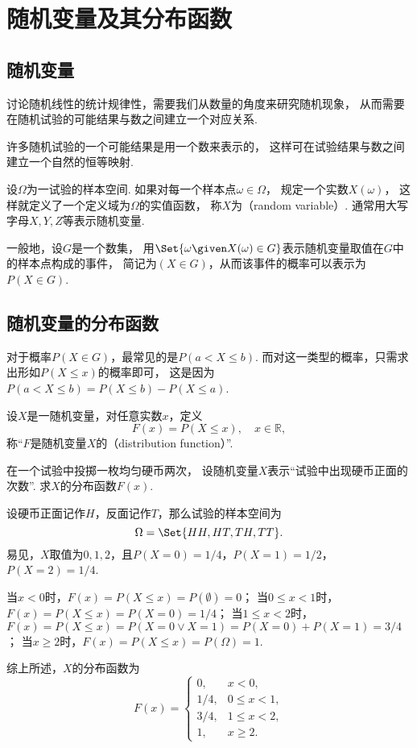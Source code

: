 \section{随机变量及其分布函数}
\subsection{随机变量}
讨论随机线性的统计规律性，需要我们从数量的角度来研究随机现象，
从而需要在随机试验的可能结果与数之间建立一个对应关系.

许多随机试验的一个可能结果是用一个数来表示的，
这样可在试验结果与数之间建立一个自然的恒等映射.

\begin{definition}
设\(\Omega\)为一试验的样本空间.
如果对每一个样本点\(\omega \in \Omega\)，
规定一个实数\(X(\omega)\)，
这样就定义了一个定义域为\(\Omega\)的实值函数，
称\(X\)为（random variable）.
通常用大写字母\(X,Y,Z\)等表示随机变量.

一般地，设\(G\)是一个数集，
用\(\Set{\omega \given X(\omega) \in G}\)表示随机变量取值在\(G\)中的样本点构成的事件，
简记为\((X \in G)\)，从而该事件的概率可以表示为\(P(X \in G)\).
\end{definition}

\subsection{随机变量的分布函数}
对于概率\(P(X \in G)\)，最常见的是\(P(a < X \leq b)\).
而对这一类型的概率，只需求出形如\(P(X \leq x)\)的概率即可，
这是因为\(P(a < X \leq b) = P(X \leq b) - P(X \leq a)\).

\begin{definition}
设\(X\)是一随机变量，对任意实数\(x\)，定义\[
	F(x) = P(X \leq x),
	\quad x \in \mathbb{R},
\]
称“\(F\)是随机变量\(X\)的（distribution function）”.
\end{definition}

\begin{example}
在一个试验中投掷一枚均匀硬币两次，
设随机变量\(X\)表示“试验中出现硬币正面的次数”.
求\(X\)的分布函数\(F(x)\).
\begin{solution}
设硬币正面记作\(H\)，反面记作\(T\)，那么试验的样本空间为\[
	\Omega = \Set{ HH, HT, TH, TT }.
\]
易见，\(X\)取值为\(0,1,2\)，且\(P(X=0) = 1/4\)，\(P(X=1) = 1/2\)，\(P(X=2) = 1/4\).

当\(x < 0\)时，\(F(x) = P(X \leq x) = P(\emptyset) = 0\)；
当\(0 \leq x < 1\)时，\(F(x) = P(X \leq x) = P(X=0) = 1/4\)；
当\(1 \leq x < 2\)时，\(F(x) = P(X \leq x) = P(X=0 \lor X=1) = P(X=0)+P(X=1) = 3/4\)；
当\(x \geq 2\)时，\(F(x) = P(X \leq x) = P(\Omega) = 1\).

综上所述，\(X\)的分布函数为\[
	F(x) = \left\{ \begin{array}{cl}
		0, & x < 0, \\
		1/4, & 0 \leq x < 1, \\
		3/4, & 1 \leq x < 2, \\
		1, & x \geq 2.
	\end{array} \right.
\]
\end{solution}
\end{example}

